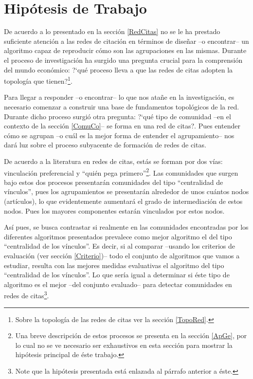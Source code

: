 \documentclass[12pt,letter]{article}
\begin{document}
\section{Hipótesis de Trabajo} \label{Hip}

De acuerdo a lo presentado en la sección \ref{RedCitas} no se le ha prestado suficiente atención a las redes de citación en términos de diseñar --o encontrar-- un algoritmo capaz de reproducir cómo son las agrupaciones en las mismas. Durante el proceso de investigación ha surgido una pregunta crucial para la comprensión del mundo económico: ?`qué proceso lleva a que las redes de citas adopten la topología que tienen?\footnote{Sobre la topología de las redes de citas ver la sección \ref{TopoRed}.}.

\vspace{0.5cm}


Para llegar a responder --o encontrar-- lo que nos atañe en la investigación, es necesario comenzar a construir una base de fundamentos topológicos de la red. Durante dicho proceso surgió otra pregunta: ?`qué tipo de comunidad --en el contexto de la sección \ref{ComuCo}-- se forma en una red de citas?. Pues entender cómo se agrupan --o cuál es la mejor forma de entender el agrupamiento-- nos dará luz sobre el proceso subyacente de formación de redes de citas.

\vspace{0.5cm}

De acuerdo a la literatura en redes de citas, estás se forman por dos vías: vinculación preferencial y ``quién pega primero''\footnote{Una breve descripción de estos procesos se presenta en la sección \ref{ApGe}, por lo cual no se ve necesario ser exhaustivos en esta sección para mostrar la hipótesis principal de éste trabajo.}. Las comunidades que surgen bajo estos dos procesos presentarán comunidades del tipo ``centralidad de vínculos'', pues los agrupamientos se presentarán alrededor de unos cuántos nodos (artículos), lo que evidentemente aumentará el grado de intermediación de estos nodos. Pues los mayores componentes estarán vinculados por estos nodos.
\vspace{0.5cm}

Así pues, se busca contrastar si realmente en las comunidades encontradas por los diferentes algoritmos presentados prevalece como mejor algoritmo el del tipo ``centralidad de los vínculos''. Es decir,  si al comparar --usando los criterios de evaluación (ver sección \ref{Criterio})-- todo el conjunto de algoritmos que vamos a estudiar, resulta con las mejores medidas evaluativas el algoritmo del tipo ``centralidad de los vínculos''. Lo que sería igual a determinar si éste tipo de algoritmo es el mejor --del conjunto evaluado-- para detectar comunidades en redes de citas\footnote{Note que la hipótesis presentada está enlazada al párrafo anterior a éste.}.
\end{document}
